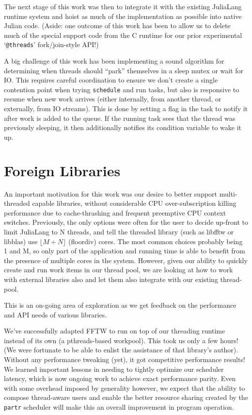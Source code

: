 \documentclass{juliacon}
\begin{document}
The next stage of this work was then to integrate it with the existing JuliaLang runtime system and hoist as much of the implementation as possible into native Julian code. (Aside: one outcome of this work has been to allow us to delete much of the special support code from the C runtime for our prior experimental `\verb|@threads|' fork/join-style API!)

A big challenge of this work has been implementing a sound algorithm for determining when threads should ``park'' themselves in a sleep mutex or wait for IO. This requires careful coordination to ensure we don't create a single contention point when trying \verb|schedule| and run tasks, but also is responsive to resume when new work arrives (either internally, from another thread, or externally, from IO streams). This is done by setting a flag in the task to notify it after work is added to the queue. If the running task sees that the thread was previously sleeping, it then additionally notifies its condition variable to wake it up.

\section{Foreign Libraries}
\label{subsub:ffi}

An important motivation for this work was our desire to better support multi-threaded capable libraries, without considerable CPU over-subscription killing performance due to cache-thrashing and frequent preemptive CPU context switches. Previously, the only options were often for the user to decide up-front to limit JuliaLang to N threads, and tell the threaded library (such as libfftw or libblas) use $\lfloor M \div N \rfloor$ (floordiv) cores. The most common choices probably being 1 and M, so only part of the application and running time is able to benefit from the presence of multiple cores in the system. However, given our ability to quickly create and run work items in our thread pool, we are looking at how to work with external libraries also and let them also integrate with our existing thread-pool.

This is an on-going area of exploration as we get feedback on the performance and API needs of various libraries.

We've successfully adapted FFTW to run on top of our threading runtime instead of its own (a pthreads-based workpool). This took us only a few hours! (We were fortunate to be able to enlist the assistance of that library's author). Without any performance tweaking (yet), it got competitive performance results! We learned important lessons in needing to tightly optimize our scheduler latency, which is now ongoing work to achieve exact performance parity. Even with some overhead imposed by generality however, we expect that the ability to compose thread-aware users and enable the better resource sharing created by the \verb|partr| scheduler will make this an overall improvement in program operation.
\end{document}
